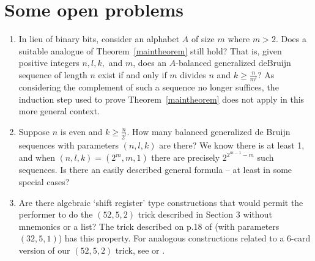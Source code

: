 \documentclass{article}
\theoremstyle{plain}
\theoremstyle{definition}
\theoremstyle{remark}
\begin{document}

\newpage

\section{Some open problems}


\begin{enumerate}
    \item In lieu of binary bits, consider an alphabet $A$ of size $m$ where $m>2.$ Does a suitable analogue of Theorem~\ref{maintheorem} still hold? That is, given positive integers $n,l,k,$ and $m$, does an $A$-balanced generalized deBruijn sequence of length $n$ exist if and only if $m$ divides $n$ and $k\geq \frac{n}{m^l}$?
    As considering the complement of such a sequence no longer suffices, the induction step used to prove Theorem~\ref{maintheorem} does not apply in this more general context.
    \item Suppose $n$ is even and $k \geqslant \frac{n}{2^l}$. How many balanced generalized de Bruijn sequences with parameters $(n,l,k)$ are there? We know there is at least 1, and when  $(n,l,k) = (2^m,m,1)$ there are precisely $2^{2^{m-1} - m}$ such sequences. Is there an easily described general formula -- at least in some special cases?
    \item Are there algebraic `shift register' type constructions that would permit the performer to do the $(52,5,2)$ trick described in Section 3 without mnemonics or a list? The trick described on p.18 of \cite{Diaconis-Graham} (with parameters $(32,5,1)$) has this property. For analogous constructions related to a 6-card version of our $(52,5,2)$ trick, see \cite{Lawson-Perfect} or \cite{Song}.
\end{enumerate}




\end{document}
